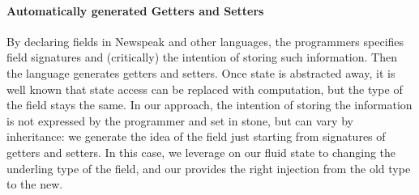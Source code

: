 % 


\paragraph{Automatically generated Getters and Setters}
By declaring fields in Newspeak and other languages,
the programmers specifies field signatures and (critically) the intention of storing such information. 
Then the language generates getters and setters.
Once state is abstracted away, it is well known that state
access can be replaced with computation, but the type of the field stays the same.
In our approach,
the intention of storing the information is not expressed by the programmer and set in stone, 
but can vary by inheritance: we generate the idea of the field
just starting from signatures of getters and setters.
In this case, we leverage on our fluid state to changing the underling type of the field,
 and our \Q@with@ provides the right injection from the old type to the new.

